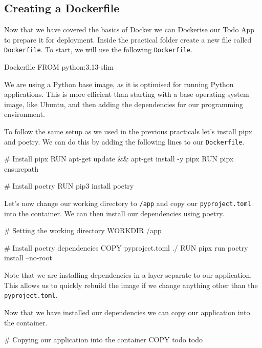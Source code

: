 \documentclass{csse4400}
\begin{document}
\subsection{Creating a Dockerfile}

Now that we have covered the basics of Docker we can Dockerise our Todo App to prepare it for deployment.
Inside the practical folder create a new file called \texttt{Dockerfile}.
To start, we will use the following \texttt{Dockerfile}.
\begin{code}[language=docker,numbers=none]{Dockerfile}
FROM python:3.13-slim
\end{code}

We are using a Python base image, as it is optimised for running Python applications.
This is more efficient than starting with a base operating system image, like Ubuntu,
and then adding the dependencies for our programming environment.

To follow the same setup as we used in the previous practicals let's install pipx and poetry.
We can do this by adding the following lines to our \texttt{Dockerfile}.

\begin{code}[language=docker,numbers=none]{}
# Install pipx
RUN apt-get update && apt-get install -y pipx
RUN pipx ensurepath

# Install poetry
RUN pip3 install poetry
\end{code}

Let's now change our working directory to \texttt{/app} and copy our \texttt{pyproject.toml} into the container.
We can then install our dependencies using poetry.

\begin{code}[language=docker,numbers=none]{}
# Setting the working directory
WORKDIR /app

# Install poetry dependencies
COPY pyproject.toml ./
RUN pipx run poetry install --no-root
\end{code}

Note that we are installing dependencies in a layer separate to our application.
This allows us to quickly rebuild the image if we change anything other than the \texttt{pyproject.toml}.

Now that we have installed our dependencies we can copy our application into the container.

\begin{code}[language=docker,numbers=none]{}
# Copying our application into the container
COPY todo todo
\end{code}
\end{document}
